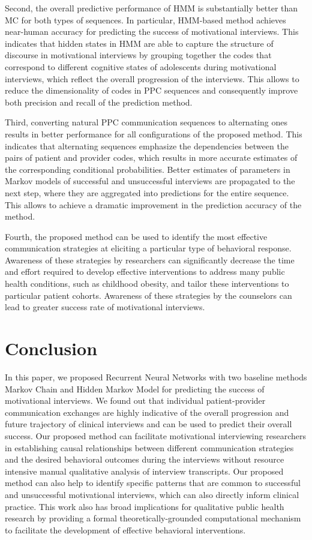 \documentclass{amia_summit_2018}
\begin{document}
Second, the overall predictive performance of HMM is substantially better than MC for both types of sequences. In particular, HMM-based method achieves near-human accuracy for predicting the success of motivational interviews. This indicates that hidden states in HMM are able to capture the structure of discourse in motivational interviews by grouping together the codes that correspond to different cognitive states of adolescents during motivational interviews, which reflect the overall progression of the interviews. This allows to reduce the dimensionality of codes in PPC sequences and consequently improve both precision and recall of the prediction method. 

Third, converting natural PPC communication sequences to alternating ones results in better performance for all configurations of the proposed method. This indicates that alternating sequences emphasize the dependencies between the pairs of patient and provider codes, which results in more accurate estimates of the corresponding conditional probabilities. Better estimates of parameters in Markov models of successful and unsuccessful interviews are propagated to the next step, where they are aggregated into predictions for the entire sequence. This allows to achieve a dramatic improvement in the prediction accuracy of the method. 

Fourth, the proposed method can be used to identify the most effective communication strategies at eliciting a particular type of behavioral response. Awareness of these strategies by researchers can significantly decrease the time and effort required to develop effective interventions to address many public health conditions, such as childhood obesity, and tailor these interventions to particular patient cohorts. Awareness of these strategies by the counselors can lead to greater success rate of motivational interviews.     
 
\section*{Conclusion}
In this paper, we proposed Recurrent Neural Networks with two baseline methods Markov Chain and Hidden Markov Model for predicting the success of motivational interviews. We found out that individual patient-provider communication exchanges are highly indicative of the overall progression and future trajectory of clinical interviews and can be used to predict their overall success. Our proposed method can facilitate motivational interviewing researchers in establishing causal relationships between different communication strategies and the desired behavioral outcomes during the interviews without resource intensive manual qualitative analysis of interview transcripts. Our proposed method can also help to identify specific patterns that are common to successful and unsuccessful motivational interviews, which can also directly inform clinical practice. This work also has broad implications for qualitative public health research by providing a formal theoretically-grounded computational mechanism to facilitate the development of effective behavioral interventions.
\end{document}
